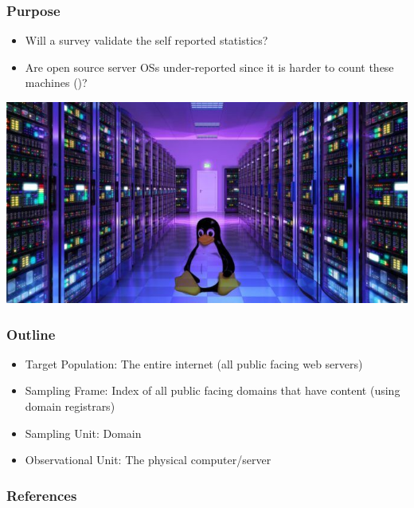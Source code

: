\documentclass{beamer}
\theoremstyle{definition}
\begin{document}
\begin{frame}
\frametitle{Purpose}
\begin{itemize}
\item Will a survey validate the self reported statistics?
\item Are open source server OSs under-reported since it is harder to count these machines (\cite{venkris2012})?
\end{itemize}
\centering
\includegraphics[scale=.45]{graphics/server.jpg}
\end{frame}




\begin{frame}
\frametitle{Outline}
\begin{itemize}
\item Target Population: The entire internet (all public facing web servers)
\item Sampling Frame: Index of all public facing domains that have content (using domain registrars)
\item Sampling Unit: Domain
\item Observational Unit: The physical computer/server
\end{itemize}
\end{frame}


\begin{frame}
\frametitle{References}
\printbibliography
\end{frame}
\end{document}
